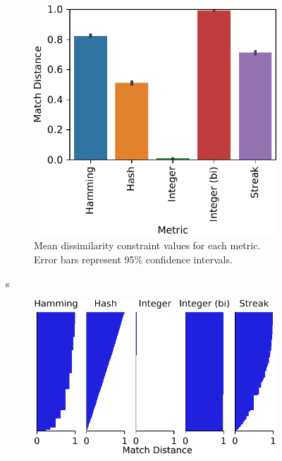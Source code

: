 \begin{figure}
\begin{center}
\begin{subfigure}[b]{\linewidth}
\begin{minipage}{0.6\linewidth}
\includegraphics[width=\linewidth]{img/sphere_reverse/bitweight=0dot5+seed=1+title=dimensionality_barplot+_data_hathash_hash=93f97a11cb443d35+_script_fullcat_hash=03ce1e318a24a109+ext=}
\end{minipage}
\begin{minipage}{0.35\linewidth}
\caption{
Mean dissimilarity constraint values for each metric.
Error bars represent 95\% confidence intervals.
}
\label{fig:sphere_reverse_distnplot}
\end{minipage}
\end{subfigure}
s
\begin{subfigure}[b]{\columnwidth}
\centering
\includegraphics[width=\columnwidth]{img/sphere_reverse/bitweight=0dot5+seed=1+title=dimensionality_distnplot+_data_hathash_hash=93f97a11cb443d35+_script_fullcat_hash=03ce1e318a24a109+ext=}

\end{subfigure}
\end{center}
\end{figure}
